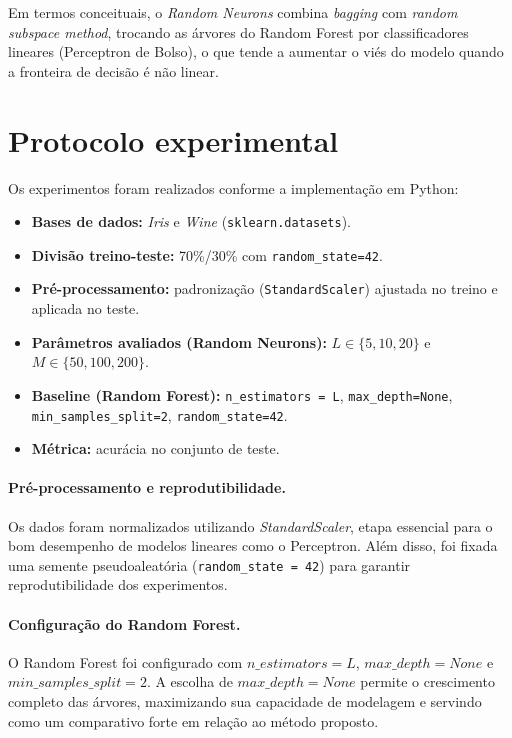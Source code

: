 \documentclass[12pt,a4paper]{article}
\begin{document}
Em termos conceituais, o \emph{Random Neurons} combina \emph{bagging} com \emph{random subspace method}, trocando as \'arvores do Random Forest por classificadores lineares (Perceptron de Bolso), o que tende a aumentar o vi\'es do modelo quando a fronteira de decis\~ao \'e n\~ao linear.

\section{Protocolo experimental}
Os experimentos foram realizados conforme a implementa\c{c}\~ao em Python:\vspace{2mm}

\begin{itemize}
	\item \textbf{Bases de dados:} \emph{Iris} e \emph{Wine} (\texttt{sklearn.datasets}).
	\item \textbf{Divis\~ao treino-teste:} 70\%/30\% com \texttt{random\_state=42}.
	\item \textbf{Pr\'e-processamento:} padroniza\c{c}\~ao (\texttt{StandardScaler}) ajustada no treino e aplicada no teste.
	\item \textbf{Par\^ametros avaliados (Random Neurons):} $L \in \{5,10,20\}$ e $M \in \{50,100,200\}$.
	\item \textbf{Baseline (Random Forest):} \texttt{n\_estimators = L}, \texttt{max\_depth=None}, \texttt{min\_samples\_split=2}, \texttt{random\_state=42}.
	\item \textbf{M\'etrica:} acur\'acia no conjunto de teste.
\end{itemize}


\paragraph{Pré-processamento e reprodutibilidade.}
Os dados foram normalizados utilizando \emph{StandardScaler}, etapa essencial para o bom desempenho de modelos lineares como o Perceptron. Além disso, foi fixada uma semente pseudoaleatória (\texttt{random\_state = 42}) para garantir reprodutibilidade dos experimentos.

\paragraph{Configuração do Random Forest.}
O Random Forest foi configurado com $n\_estimators = L$, $max\_depth = None$ e $min\_samples\_split = 2$. A escolha de $max\_depth=None$ permite o crescimento completo das árvores, maximizando sua capacidade de modelagem e servindo como um comparativo forte em relação ao método proposto.
\end{document}
